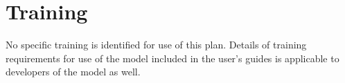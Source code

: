 \documentclass[11pt]{book}
\begin{document}
\section{Training}

No specific training is identified for use of this plan.  Details of training requirements for use of the model included in the user's guides is applicable to developers of the model as well.



\backmatter
\nopart



\printindex
\end{document}
